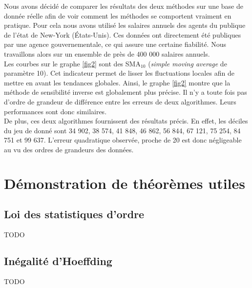 {Nous avons décidé de comparer les résultats des deux méthodes sur une base de donnée réelle \cite{salaries} afin de voir comment les méthodes se comportent vraiment en pratique. Pour cela nous avons utilisé les salaires annuels des agents du publique de l'état de New-York (États-Unis). Ces données ont directement été publiques par une agence gouvernementale, ce qui assure une certaine fiabilité. Nous travaillons alors sur un ensemble de près de 400 000 salaires annuels.\\

Les courbes sur le graphe \ref{fig2} sont des SMA\(_{10}\) (\textit{simple moving average} de paramètre 10). Cet indicateur permet de lisser les fluctuations locales afin de mettre en avant les tendances globales. Ainsi, le graphe \ref{fig2} montre que la méthode de sensibilité inverse est globalement plus précise. Il n'y a toute fois pas d'ordre de grandeur de différence entre les erreurs de deux algorithmes. Leurs performances sont donc similaires.\\

De plus, ces deux algorithmes fournissent des résultats précis. En effet, les déciles du jeu de donné sont 34 902, 38 574, 41 848, 46 862, 56 844, 67 121, 75 254, 84 751 et 99 637. L'erreur quadratique observée, proche de 20 est donc négligeable au vu des ordres de grandeurs des données.}



\newpage
\cleardoublepage
{}
{}
\printbibliography





\newpage
{}
\appendix

\section{Démonstration de théorèmes utiles}

\subsection{Loi des statistiques d'ordre}\label{statordre}

TODO

\subsection{Inégalité d'{\sc Hoeffding}}\label{hoef}

TODO

